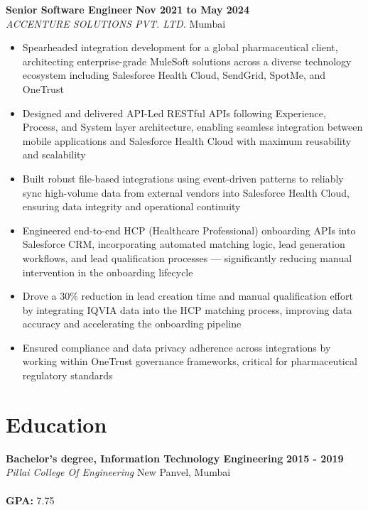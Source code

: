\documentclass[11pt,a4paper]{article}
\begin{document}
\vspace{6pt}
\textbf{Senior Software Engineer} \hfill \textbf{Nov 2021 to May 2024}\\
\textit{ACCENTURE SOLUTIONS PVT. LTD.} \hfill Mumbai
\begin{itemize}
  \item Spearheaded integration development for a global pharmaceutical client, architecting enterprise-grade MuleSoft solutions across a diverse technology ecosystem including Salesforce Health Cloud, SendGrid, SpotMe, and OneTrust
  \item Designed and delivered API-Led RESTful APIs following Experience, Process, and System layer architecture, enabling seamless integration between mobile applications and Salesforce Health Cloud with maximum reusability and scalability
  \item Built robust file-based integrations using event-driven patterns to reliably sync high-volume data from external vendors into Salesforce Health Cloud, ensuring data integrity and operational continuity
  \item Engineered end-to-end HCP (Healthcare Professional) onboarding APIs into Salesforce CRM, incorporating automated matching logic, lead generation workflows, and lead qualification processes — significantly reducing manual intervention in the onboarding lifecycle
  \item Drove a 30\% reduction in lead creation time and manual qualification effort by integrating IQVIA data into the HCP matching process, improving data accuracy and accelerating the onboarding pipeline
  \item Ensured compliance and data privacy adherence across integrations by working within OneTrust governance frameworks, critical for pharmaceutical regulatory standards
\end{itemize}

\section{Education}
\textbf{Bachelor's degree, Information Technology Engineering} \hfill \textbf{2015 - 2019}\\
\textit{Pillai College Of Engineering} \hfill New Panvel, Mumbai
 \\\\ \textbf{GPA:} 7.75
\end{document}
